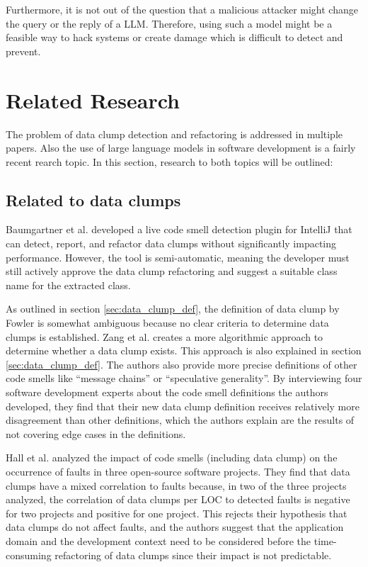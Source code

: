 Furthermore, it is not out of the question that a malicious attacker might change the query or the reply of a \ac{LLM}. Therefore, using such a model might be a feasible way to hack systems or create damage which is difficult to detect and prevent. 

\section{Related Research}
The problem of data clump detection and refactoring is addressed in multiple papers. Also the  use of large language models in software development is a fairly recent rearch topic. In this section, research to both topics will be outlined: 

\subsection{Related to data clumps}
Baumgartner et al.  developed a live code smell detection plugin for IntelliJ that can detect, report, and refactor data clumps without significantly impacting performance. However, the tool is semi-automatic, meaning the developer must still actively approve the data clump refactoring and suggest a suitable class name for the extracted class. \cite{BaumgartnerAP23}

As outlined in section \ref{sec:data_clump_def}, the definition of data clump by Fowler \cite{fowler2019refactoring} is somewhat ambiguous because no clear criteria to determine data clumps is established. Zang et al. \cite{zhangImprovingPrecisionFowler2008} creates a more algorithmic approach to determine whether a data clump exists. This approach is also explained in section \ref{sec:data_clump_def}. The authors also provide more precise definitions of other code smells like \enquote{message chains} or \enquote{speculative generality}. By interviewing four software development experts about the code smell definitions the authors developed, they find that their new data clump definition receives relatively more disagreement than other definitions, which the authors explain are the results of not covering edge cases in the definitions. 


Hall et al. analyzed the impact of code smells (including data clump) on the occurrence of faults in three open-source software projects. They find that data clumps have a mixed correlation to faults because, in two of the three projects analyzed, the correlation of data clumps per \ac{LOC} to detected faults is negative for two projects and positive for one project. This rejects their hypothesis that data clumps do not affect faults, and the authors suggest that the application domain and the development context need to be considered before the time-consuming refactoring of data clumps since their impact is not predictable.  \cite{hallCodeSmellsHave2014}

